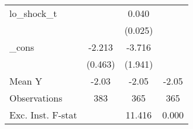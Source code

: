 {\begin{tabular}{l*{3}{c}}
\addlinespace
lo\_shock\_t  &                     &       0.040         &                     \\
            &                     &     (0.025)         &                     \\
\addlinespace
\_cons      &      -2.213\sym{***}&      -3.716\sym{*}  &                     \\
            &     (0.463)         &     (1.941)         &                     \\
\midrule
Mean Y      &       -2.03         &       -2.05         &       -2.05         \\
Observations&         383         &         365         &         365         \\
Exc. Inst. F-stat&                     &      11.416         &       0.000         \\
\bottomrule
\end{tabular}
}
